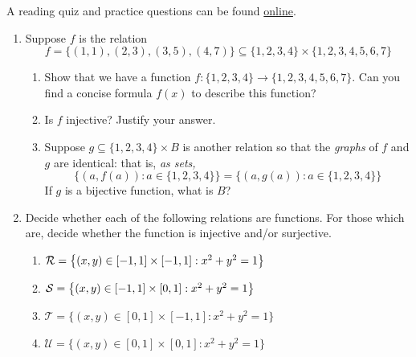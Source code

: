 \begin{exercises}{}{}
	A reading quiz and practice questions can be found \href{http://www.math.uci.edu/~ndonalds/math13/selftest/7-2-functions.html}{online}.


\begin{enumerate}
  \item Suppose $f$ is the relation
  \[
  	f=\bigl\{(1,1),(2,3),(3,5),(4,7)\bigr\} \subseteq\{1,2,3,4\}\times\{1,2,3,4,5,6,7\}
  \]
  \begin{enumerate}
    \item Show that we have a function $f:\{1,2,3,4\}\to\{1,2,3,4,5,6,7\}$. Can you find a concise formula $f(x)$ to describe this function?
    \item Is $f$ injective? Justify your answer.
    \item Suppose $g\subseteq\{1,2,3,4\}\times B$ is another relation so that the \emph{graphs} of $f$ and $g$ are identical: that is, \emph{as sets,}
    \[
    	\bigl\{(a,f(a)):a\in\{1,2,3,4\}\bigr\} = \bigl\{(a,g(a)):a\in\{1,2,3,4\}\bigr\}
    \]
    If $g$ is a bijective function, what is $B$?
  \end{enumerate}
  
  \item Decide whether each of the following relations are functions. For those which are, decide whether the function is injective and/or surjective.
  \begin{enumerate}
    \item $\mathcal{R}=\bigl\{(x,y)\in[-1,1]\times[-1,1]:x^2+y^2=1\bigr\}$
    \item $\mathcal{S}=\bigl\{(x,y)\in[-1,1]\times[0,1]:x^2+y^2=1\bigr\}$
    \item $\mathcal T=\bigl\{(x,y)\in[0,1]\times[-1,1]:x^2+y^2=1\bigr\}$
    \item $\mathcal U=\bigl\{(x,y)\in[0,1]\times[0,1]:x^2+y^2=1\bigr\}$
  \end{enumerate}
  
  
  

\end{enumerate}
\end{exercises}
